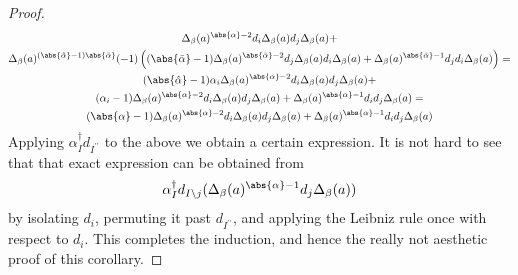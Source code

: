 \begin{cor}
\begin{proof}
\begin{gather*}
    \Delta_\beta(a)^{\abs{\alpha} - 2} %
    d_i \Delta_\beta(a) d_j \Delta_\beta (a) %
    + \\%
    \Delta_\beta(a)^{(\abs{\hat\alpha}-1)\abs{\bar\alpha}} %
    (-1) \left( %
    (\abs{\bar\alpha}-1) %
    \Delta_\beta (a)^{\abs{\bar\alpha}-2} %
    d_j \Delta_\beta (a) d_i \Delta_\beta (a) %
    + %
    \Delta_\beta(a)^{\abs{\bar\alpha}-1} %
    d_j d_i \Delta_\beta(a)
    \right) = \\%
  (\abs{\hat\alpha}-1)\alpha_i%
    \Delta_\beta(a)^{\abs{\alpha} - 2} %
    d_i \Delta_\beta(a) d_j \Delta_\beta (a) %
    + \\%
    (\alpha_i-1) %
    \Delta_\beta(a)^{\abs{\alpha}-2} %
    d_i \Delta_\beta (a) d_j \Delta_\beta (a) %
    + %
    \Delta_\beta(a)^{\abs{\alpha}-1} %
    d_i d_j \Delta_\beta(a) = \\%
  (\abs{\alpha}-1)%
    \Delta_\beta(a)^{\abs{\alpha} - 2} %
    d_i \Delta_\beta(a) d_j \Delta_\beta (a) %
    + %
    \Delta_\beta(a)^{\abs{\alpha}-1} %
    d_i d_j \Delta_\beta(a)%
  \end{gather*}
Applying $\alpha^\dagger_I d_{I^{\prime\prime}}$ to the above we obtain a certain expression. It is not hard to see that that exact expression can be obtained from
\begin{equation*}
  \alpha^\dagger_I d_{I \setminus j} %
    ( \Delta_\beta(a)^{\abs{\alpha}-1} d_j \Delta_\beta (a) )
\end{equation*}
by isolating $d_i$, permuting it past $d_{I^{\prime\prime}}$, and applying the Leibniz rule once with respect to $d_i$. This completes the induction, and hence the really not aesthetic proof of this corollary.
\end{proof}
\end{cor}
%
%
